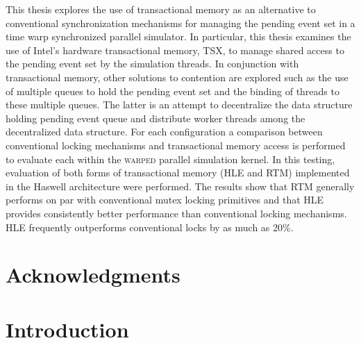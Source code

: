 \documentclass[11pt]{book}
\begin{document}
This thesis explores the use of transactional memory as an alternative to conventional
synchronization mechanisms for managing the pending event set in a time warp synchronized
parallel simulator.  In particular, this thesis examines the use of Intel's hardware
transactional memory, TSX, to manage shared access to the pending event set by the
simulation threads.  In conjunction with transactional memory, other solutions to
contention are explored such as the use of multiple queues to hold the pending event set
and the binding of threads to these multiple queues.  The latter is an attempt to
decentralize the data structure holding pending event queue and distribute worker threads
among the decentralized data structure.  For each configuration a comparison between
conventional locking mechanisms and transactional memory access is performed to evaluate
each within the \textsc{warped} parallel simulation kernel.  In this testing, evaluation
of both forms of transactional memory (HLE and RTM) implemented in the Haswell
architecture were performed.  The results show that RTM generally performs on par with
conventional mutex locking primitives and that HLE provides consistently better
performance than conventional locking mechanisms.  HLE frequently outperforms conventional
locks by as much as 20\%.

\chapter*{Acknowledgments} 



\tableofcontents \markright{ }
\listoffigures \markright{ }
\listoftables \markright{ }

\clearpage
{} \setcounter{page}{1}

\chapter{Introduction}\label{intro} 
\end{document}
